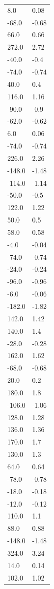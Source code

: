 \begin{longtable}{ll}
8.0 & 0.08 \\
-68.0 & -0.68 \\
66.0 & 0.66 \\
272.0 & 2.72 \\
-40.0 & -0.4 \\
-74.0 & -0.74 \\
40.0 & 0.4 \\
116.0 & 1.16 \\
-90.0 & -0.9 \\
-62.0 & -0.62 \\
6.0 & 0.06 \\
-74.0 & -0.74 \\
226.0 & 2.26 \\
-148.0 & -1.48 \\
-114.0 & -1.14 \\
-50.0 & -0.5 \\
122.0 & 1.22 \\
50.0 & 0.5 \\
58.0 & 0.58 \\
-4.0 & -0.04 \\
-74.0 & -0.74 \\
-24.0 & -0.24 \\
-96.0 & -0.96 \\
-6.0 & -0.06 \\
-182.0 & -1.82 \\
142.0 & 1.42 \\
140.0 & 1.4 \\
-28.0 & -0.28 \\
162.0 & 1.62 \\
-68.0 & -0.68 \\
20.0 & 0.2 \\
180.0 & 1.8 \\
-106.0 & -1.06 \\
128.0 & 1.28 \\
136.0 & 1.36 \\
170.0 & 1.7 \\
130.0 & 1.3 \\
64.0 & 0.64 \\
-78.0 & -0.78 \\
-18.0 & -0.18 \\
-12.0 & -0.12 \\
110.0 & 1.1 \\
88.0 & 0.88 \\
-148.0 & -1.48 \\
324.0 & 3.24 \\
14.0 & 0.14 \\
102.0 & 1.02 \\

\end{longtable}

